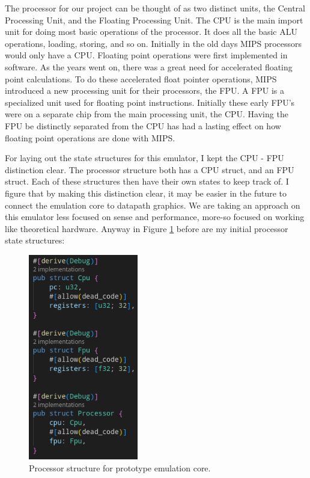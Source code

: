 \documentclass[
    paper=letter,
    parskip=half,
    fontsize=12pt,
    titlepage=firstiscover,
    toc=bibliography,
    numbers=endperiod
]{scrartcl}
\begin{document}
The processor for our project can be thought of as two distinct units,
the Central Processing Unit, and the Floating Processing Unit. The CPU
is the main import unit for doing most basic operations of the
processor. It does all the basic ALU operations, loading, storing, and
so on. Initially in the old days MIPS processors would only have a CPU.
Floating point operations were first implemented in software. As the
years went on, there was a great need for accelerated floating point
calculations. To do these accelerated float pointer operations, MIPS
introduced a new processing unit for their processors, the FPU. A FPU is
a specialized unit used for floating point instructions. Initially these
early FPU's were on a separate chip from the main processing unit, the
CPU. Having the FPU be distinctly separated from the CPU has had a
lasting effect on how floating point operations are done with MIPS.

For laying out the state structures for this emulator, I kept the CPU -
FPU distinction clear. The processor structure both has a CPU struct,
and an FPU struct. Each of these structures then have their own states
to keep track of. I figure that by making this distinction clear, it may
be easier in the future to connect the emulation core to datapath
graphics. We are taking an approach on this emulator less focused on
sense and performance, more-so focused on working like theoretical
hardware. Anyway in Figure \ref{fig:kevin-emulation-core-prototype}
before are my initial processor state structures:

\begin{figure}[H]
    \includegraphics[height=9cm]{kevin-emulation-core-prototype}
    \caption{Processor structure for prototype emulation core.}
    \label{fig:kevin-emulation-core-prototype}
\end{figure}
\end{document}
